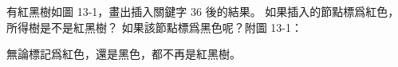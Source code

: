 \startEXERCISE
有紅黑樹如圖 13-1，畫出插入關鍵字 $36$ 後的結果。
如果插入的節點標爲紅色，所得樹是不是紅黑樹？
如果該節點標爲黑色呢？附圖 13-1：

\stopEXERCISE

\startANSWER
無論標記爲紅色，還是黑色，都不再是紅黑樹。
\stopANSWER

